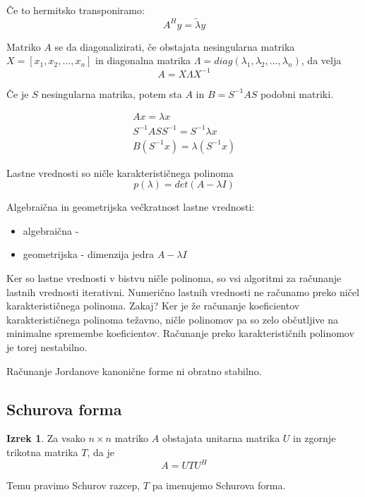 \documentclass[a4paper,12pt]{article}
\theoremstyle{definition}
\newtheorem{theorem}[counter]{Izrek}
\theoremstyle{remark}
\begin{document}
Če to hermitsko transponiramo:
\begin{equation*}
    A^H y = \tilde{\lambda} y
\end{equation*}

Matriko $A$ se da diagonalizirati, če obstajata nesingularna matrika $X = [x_1, x_2, \dots, x_n]$ in diagonalna matrika $\Lambda = diag(\lambda_1, \lambda_2, \dots, \lambda_n)$,
da velja
\begin{equation*}
    A = X \Lambda X^{-1}
\end{equation*}

Če je $S$ nesingularna matrika, potem sta $A$ in $B = S^{-1}AS$ podobni matriki.

\begin{gather*}
    Ax = \lambda x \\
    S^{-1} AS S^{-1} = S^{-1} \lambda x \\
    B(S^{-1} x) = \lambda (S^{-1} x)
\end{gather*}


Lastne vrednosti so ničle karakterističnega polinoma
\begin{equation*}
    p(\lambda) = det(A - \lambda I)
\end{equation*}

Algebraična in geometrijska večkratnost lastne vrednosti:
\begin{itemize}
    \item algebraična - 
    \item geometrijska - dimenzija jedra $A - \lambda I$
\end{itemize}

Ker so lastne vrednosti v bistvu ničle polinoma, so vsi algoritmi za računanje lastnih vrednosti iterativni. Numerično lastnih vrednosti ne računamo
preko ničel karakterističnega polinoma. Zakaj? Ker je že računanje koeficientov karakterističnega polinoma težavno, ničle polinomov pa so zelo občutljive
na minimalne spremembe koeficientov. Računanje preko karakterističnih polinomov je torej nestabilno.

Računanje Jordanove kanonične forme ni obratno stabilno.

\subsection{Schurova forma}

\begin{theorem}
    Za vsako $n \times n$ matriko $A$ obstajata unitarna matrika $U$ in zgornje trikotna matrika $T$, da je
    \begin{equation*}
        A = U T U^H
    \end{equation*}

    Temu pravimo Schurov razcep, $T$ pa imenujemo Schurova forma.
\end{theorem}
\end{document}
